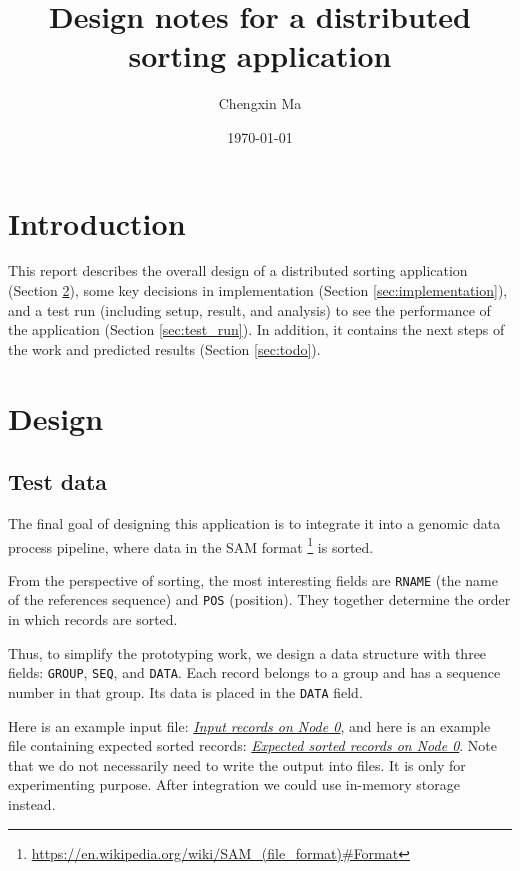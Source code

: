 \documentclass{article}
\title{Design notes for a distributed sorting application}
\author{Chengxin Ma}
\date{\today}
\begin{document}
\maketitle

\section{Introduction}
This report describes the overall design of a distributed sorting application (Section \ref{sec:design}),
some key decisions in implementation (Section \ref{sec:implementation}), 
and a test run (including setup, result, and analysis) to see the performance of the application (Section \ref{sec:test_run}).
In addition, it contains the next steps of the work and predicted results (Section \ref{sec:todo}).

\section{Design}
\label{sec:design}
\subsection{Test data}
The final goal of designing this application is to integrate it into a genomic data process pipeline, where data in the SAM format
\footnote{\url{https://en.wikipedia.org/wiki/SAM_(file_format)\#Format}} is sorted.

From the perspective of sorting, the most interesting fields are \texttt{RNAME} (the name of the references sequence) and \texttt{POS} (position).
They together determine the order in which records are sorted.

Thus, to simplify the prototyping work, we design a data structure with three fields: \texttt{GROUP}, \texttt{SEQ}, and \texttt{DATA}.
Each record belongs to a group and has a sequence number in that group.
Its data is placed in the \texttt{DATA} field.

Here is an example input file: \href{https://github.com/MaChengxin/playground/blob/master/arrow/flight/my_flight/data/4_nodes/records_on_node_0.txt}{\textit{Input records on Node 0}},
and here is an example file containing expected sorted records: \href{https://github.com/MaChengxin/playground/blob/master/arrow/flight/my_flight/data/4_nodes/expected_records_on_node_0.txt}{\textit{Expected sorted records on Node 0}}.
Note that we do not necessarily need to write the output into files.
It is only for experimenting purpose.
After integration we could use in-memory storage instead.
\end{document}
